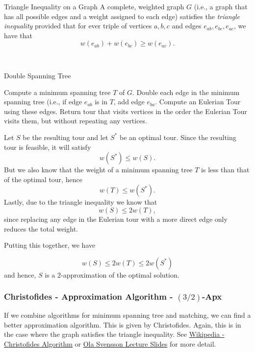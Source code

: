 \begin{definition}{Triangle Inequality on a Graph}{}
A complete, weighted graph $G$ (i.e., a graph that has all possible edges and a weight assigned to each edge) satisfies the \emph{triangle inequality} provided that for ever triple of vertices $a,b,c$ and edges $e_{ab}, e_{bc}, e_{ac}$, we have that 
\[
w(e_{ab}) + w(e_{bc}) \geq w(e_{ac}).
\]
\end{definition}



\begin{algorithm}
\\
\caption{Double Spanning Tree}\label{alg:double-spanning-tree}
\begin{algorithmic}[1]
	\State Compute a minimum spanning tree $T$ of $G$.
 	\State Double each edge in the minimum spanning tree (i.e., if edge $e_{ab}$ is in $T$, add edge $e_{ba}$. 
	\State Compute an Eulerian Tour  using these edges.
	\State Return tour that visits vertices in the order the Eulerian Tour visits them, but without repeating any vertices.
	\end{algorithmic}
\end{algorithm}

Let $S$ be the resulting tour and let $S^*$ be an optimal tour.
Since the resulting tour is feasible, it will satisfy 
\[
w(S^*) \leq w(S).
\]
But we also know that the weight of a minimum spanning tree $T$ is less than that of the optimal tour, hence
\[
w(T) \leq w(S^*).
\]
Lastly, due to the triangle inequality we know that 
\[
w(S) \leq 2 w(T),
\]
since replacing any edge in the Eulerian tour with a more direct edge only reduces the total weight.

Putting this together, we have

\[w(S) \leq 2w(T) \leq 2 w(S^*)\]
and hence, $S$ is a 2-approximation of the optimal solution.


\subsubsection{Christofides - Approximation Algorithm - $(3/2)$-Apx}
If we combine algorithms for minimum spanning tree and matching, we can find a better approximation algorithm.  This is given by Christofides.  Again, this is in the case where the graph satisfies the triangle inequality.  See 
\href{https://en.wikipedia.org/wiki/Christofides_algorithm}{Wikipedia - Christofides Algorithm} or \href{https://resources.mpi-inf.mpg.de/conferences/adfocs-15/material/Ola-Lect1.pdf}{Ola Svensson Lecture Slides} for more detail.



